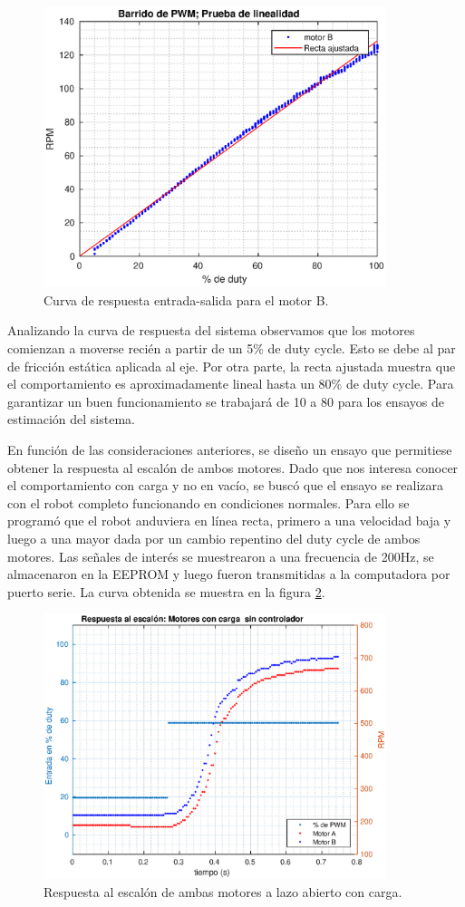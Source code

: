 \documentclass[10pt,conference,a4paper,onecolumn]{article}%
\begin{document}
\begin{figure}
\centering
\includegraphics[width=10cm]{./imagenes/prueba_linealidad.eps}
\caption{Curva de respuesta entrada-salida para el motor B.}
\label{linealidad}
\end{figure}

Analizando la curva de respuesta del sistema observamos que los motores comienzan a moverse recién a partir de un 5\% de duty cycle. Esto se debe al par de fricción estática aplicada al eje. Por otra parte, la recta ajustada muestra que el comportamiento es aproximadamente lineal hasta un 80\% de duty cycle. Para garantizar un buen funcionamiento se trabajará de 10 a 80 para los ensayos de estimación del sistema.

En función de las consideraciones anteriores, se diseño un ensayo que permitiese obtener la respuesta al escalón de ambos motores. Dado que nos interesa conocer el comportamiento con carga y no en vacío, se buscó que el ensayo se realizara con el robot completo funcionando en condiciones normales. Para ello se programó que el robot anduviera en línea recta, primero a una velocidad baja y luego a una mayor dada por un cambio repentino del duty cycle de ambos motores. Las señales de interés se muestrearon a una frecuencia de 200Hz, se almacenaron en la EEPROM y luego fueron transmitidas a la computadora por puerto serie. La curva obtenida se muestra en la figura \ref{EscalonMotores}.
\begin{figure}[h]
\centering
\includegraphics[width=10cm]{./imagenes/resp_escalon_motores_2}
\caption{Respuesta al escalón de ambas motores a lazo abierto con carga.}
\label{EscalonMotores}
\end{figure}
\end{document}
